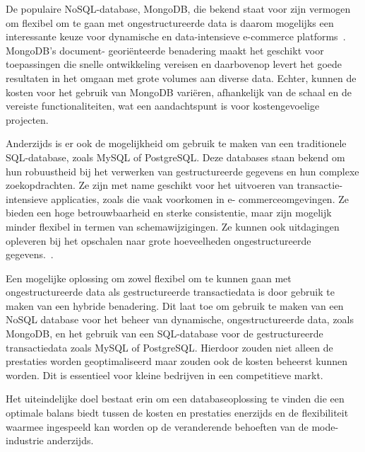 De populaire NoSQL-database, MongoDB, die bekend staat voor zijn vermogen om flexibel om te
gaan met ongestructureerde data is daarom mogelijks een interessante keuze voor dynamische en
data-intensieve e-commerce platforms~\autocite{Inetum2022}. MongoDB's document-
georiënteerde benadering maakt het geschikt voor toepassingen die snelle ontwikkeling vereisen en
daarbovenop levert het goede resultaten in het omgaan met grote volumes aan diverse data. Echter,
kunnen de kosten voor het gebruik van MongoDB variëren, afhankelijk van de schaal en de vereiste
functionaliteiten, wat een aandachtspunt is voor kostengevoelige projecten.

Anderzijds is er ook de mogelijkheid om gebruik te maken van een traditionele SQL-database, zoals
MySQL of PostgreSQL. Deze databases staan bekend om hun robuustheid bij het verwerken van
gestructureerde gegevens en hun complexe zoekopdrachten. Ze zijn met name geschikt voor het
uitvoeren van transactie-intensieve applicaties, zoals die vaak voorkomen in e-
commerceomgevingen. Ze bieden een hoge betrouwbaarheid en sterke consistentie, maar zijn
mogelijk minder flexibel in termen van schemawijzigingen. Ze kunnen ook uitdagingen opleveren bij
het opschalen naar grote hoeveelheden ongestructureerde gegevens.~\autocite{UZAYR2023}.

Een mogelijke oplossing om zowel flexibel om te kunnen gaan met ongestructureerde data als
gestructureerde transactiedata is door gebruik te maken van een hybride benadering. Dit laat toe om
gebruik te maken van een NoSQL database voor het beheer van dynamische, ongestructureerde
data, zoals MongoDB, en het gebruik van een SQL-database voor de gestructureerde transactiedata
zoals MySQL of PostgreSQL. Hierdoor zouden niet alleen de prestaties worden geoptimaliseerd maar
zouden ook de kosten beheerst kunnen worden. Dit is essentieel voor kleine bedrijven in een
competitieve markt.

Het uiteindelijke doel bestaat erin om een databaseoplossing te vinden die een optimale balans biedt
tussen de kosten en prestaties enerzijds en de flexibiliteit waarmee ingespeeld kan worden op de
veranderende behoeften van de mode-industrie anderzijds.




